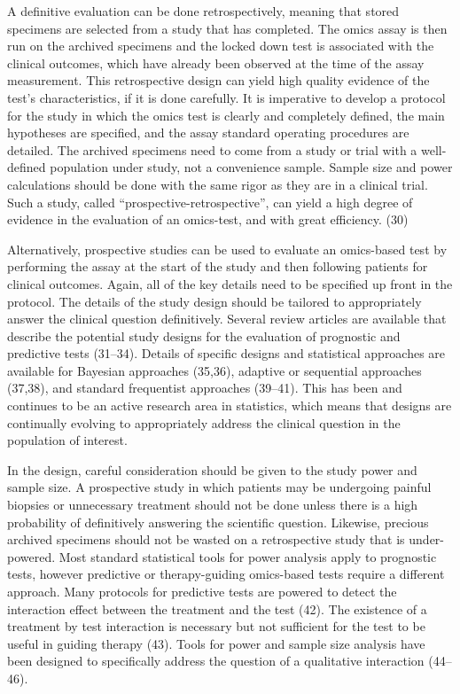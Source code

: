 \documentclass[11pt]{article}
\begin{document}
A definitive evaluation can be done retrospectively, meaning that stored
specimens are selected from a study that has completed. The omics assay
is then run on the archived specimens and the locked down test is
associated with the clinical outcomes, which have already been observed
at the time of the assay measurement. This retrospective design can
yield high quality evidence of the test's characteristics, if it is done
carefully. It is imperative to develop a protocol for the study in which
the omics test is clearly and completely defined, the main hypotheses
are specified, and the assay standard operating procedures are detailed.
The archived specimens need to come from a study or trial with a
well-defined population under study, not a convenience sample. Sample
size and power calculations should be done with the same rigor as they
are in a clinical trial. Such a study, called
``prospective-retrospective'', can yield a high degree of evidence in
the evaluation of an omics-test, and with great efficiency. (30)

Alternatively, prospective studies can be used to evaluate an
omics-based test by performing the assay at the start of the study and
then following patients for clinical outcomes. Again, all of the key
details need to be specified up front in the protocol. The details of
the study design should be tailored to appropriately answer the clinical
question definitively. Several review articles are available that
describe the potential study designs for the evaluation of prognostic
and predictive tests (31--34). Details of specific designs and
statistical approaches are available for Bayesian approaches (35,36),
adaptive or sequential approaches (37,38), and standard frequentist
approaches (39--41). This has been and continues to be an active
research area in statistics, which means that designs are continually
evolving to appropriately address the clinical question in the
population of interest.

In the design, careful consideration should be given to the study power
and sample size. A prospective study in which patients may be undergoing
painful biopsies or unnecessary treatment should not be done unless
there is a high probability of definitively answering the scientific
question. Likewise, precious archived specimens should not be wasted on
a retrospective study that is under-powered. Most standard statistical
tools for power analysis apply to prognostic tests, however predictive
or therapy-guiding omics-based tests require a different approach. Many
protocols for predictive tests are powered to detect the interaction
effect between the treatment and the test (42). The existence of a
treatment by test interaction is necessary but not sufficient for the
test to be useful in guiding therapy (43). Tools for power and sample
size analysis have been designed to specifically address the question of
a qualitative interaction (44--46).
\end{document}
